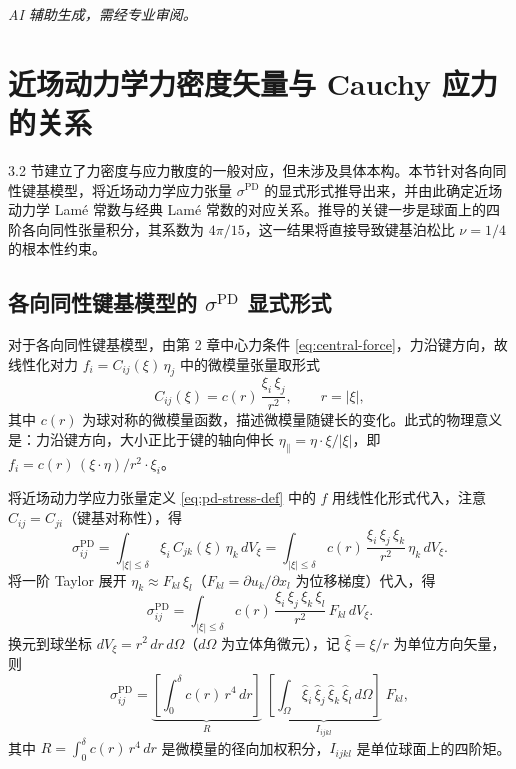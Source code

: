 \emph{AI 辅助生成，需经专业审阅。}

\section{近场动力学力密度矢量与 Cauchy 应力的关系}
\label{sec:force-cauchy}

3.2 节建立了力密度与应力散度的一般对应，但未涉及具体本构。本节针对各向同性键基模型，将近场动力学应力张量 $\sigma^{\mathrm{PD}}$ 的显式形式推导出来，并由此确定近场动力学 Lam\'e 常数与经典 Lam\'e 常数的对应关系。推导的关键一步是球面上的四阶各向同性张量积分，其系数为 $4\pi/15$，这一结果将直接导致键基泊松比 $\nu=1/4$ 的根本性约束。

\subsection{各向同性键基模型的 \texorpdfstring{$\sigma^{\mathrm{PD}}$}{sigma PD} 显式形式}
\label{subsec:isotropic-sigma}

对于各向同性键基模型，由第 2 章中心力条件 \eqref{eq:central-force}，力沿键方向，故线性化对力 $f_i=C_{ij}(\xi)\,\eta_j$ 中的微模量张量取形式
\begin{equation}
\label{eq:iso-micro-modulus}
C_{ij}(\xi) = c(r)\,\frac{\xi_i\,\xi_j}{r^2},\qquad r=|\xi|,
\end{equation}
其中 $c(r)$ 为球对称的微模量函数，描述微模量随键长的变化。此式的物理意义是：力沿键方向，大小正比于键的轴向伸长 $\eta_\parallel=\eta\cdot\xi/|\xi|$，即 $f_i=c(r)\,(\xi\cdot\eta)/r^2\cdot\xi_i$。

将近场动力学应力张量定义 \eqref{eq:pd-stress-def} 中的 $f$ 用线性化形式代入，注意 $C_{ij}=C_{ji}$（键基对称性），得
\begin{equation}
\label{eq:sigma-pd-linear}
\sigma^{\mathrm{PD}}_{ij} = \int_{|\xi|\le\delta} \xi_i\,C_{jk}(\xi)\,\eta_k\,dV_\xi = \int_{|\xi|\le\delta} c(r)\,\frac{\xi_i\,\xi_j\,\xi_k}{r^2}\,\eta_k\,dV_\xi.
\end{equation}
将一阶 Taylor 展开 $\eta_k\approx F_{kl}\,\xi_l$（$F_{kl}=\partial u_k/\partial x_l$ 为位移梯度）代入，得
\begin{equation}
\label{eq:sigma-pd-F}
\sigma^{\mathrm{PD}}_{ij} = \int_{|\xi|\le\delta} c(r)\,\frac{\xi_i\,\xi_j\,\xi_k\,\xi_l}{r^2}\,F_{kl}\,dV_\xi.
\end{equation}
换元到球坐标 $dV_\xi=r^2\,dr\,d\Omega$（$d\Omega$ 为立体角微元），记 $\hat{\xi}=\xi/r$ 为单位方向矢量，则
\begin{equation}
\label{eq:sigma-pd-sep}
\sigma^{\mathrm{PD}}_{ij} = \underbrace{\left[\int_0^\delta c(r)\,r^4\,dr\right]}_{R}\;\underbrace{\left[\int_\Omega \hat{\xi}_i\,\hat{\xi}_j\,\hat{\xi}_k\,\hat{\xi}_l\,d\Omega\right]}_{I_{ijkl}}\;F_{kl},
\end{equation}
其中 $R=\int_0^\delta c(r)\,r^4\,dr$ 是微模量的径向加权积分，$I_{ijkl}$ 是单位球面上的四阶矩。

